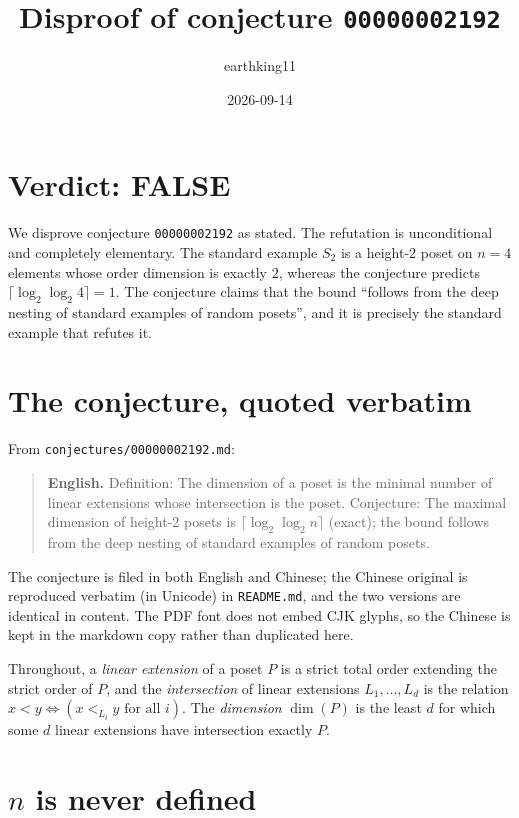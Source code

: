 \documentclass[11pt]{article}
\title{Disproof of conjecture \texttt{00000002192}}
\author{earthking11}
\date{2026-09-14}
\theoremstyle{definition}
\theoremstyle{remark}
\begin{document}
\maketitle

\section*{Verdict: FALSE}

We disprove conjecture \texttt{00000002192} as stated. The refutation is
unconditional and completely elementary. The standard example $S_2$ is a
height-$2$ poset on $n=4$ elements whose order dimension is exactly $2$,
whereas the conjecture predicts $\lceil \log_2\log_2 4\rceil = 1$. The
conjecture claims that the bound ``follows from the deep nesting of standard
examples of random posets'', and it is precisely the standard example that
refutes it.

\section{The conjecture, quoted verbatim}

From \texttt{conjectures/00000002192.md}:

\begin{quote}
\textbf{English.} Definition: The dimension of a poset is the minimal number of
linear extensions whose intersection is the poset. Conjecture: The maximal
dimension of height-2 posets is $\lceil \log_2 \log_2 n\rceil$ (exact); the bound
follows from the deep nesting of standard examples of random posets.
\end{quote}

The conjecture is filed in both English and Chinese; the Chinese original is
reproduced verbatim (in Unicode) in \texttt{README.md}, and the two versions are
identical in content. The PDF font does not embed CJK glyphs, so the Chinese is
kept in the markdown copy rather than duplicated here.

Throughout, a \emph{linear extension} of a poset $P$ is a strict total order
extending the strict order of $P$, and the \emph{intersection} of linear
extensions $L_1,\dots,L_d$ is the relation
$x < y \iff (x <_{L_i} y \text{ for all } i)$. The \emph{dimension} $\dim(P)$ is
the least $d$ for which some $d$ linear extensions have intersection exactly
$P$.

\section{\texorpdfstring{$n$}{n} is never defined}
\end{document}
